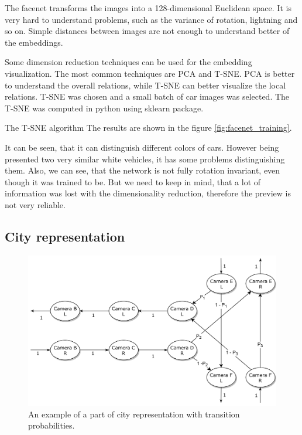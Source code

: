 \documentclass[a4paper,11pt,titlepage,twoside]{article}
\numberwithin{figure}{section}
\begin{document}
The facenet transforms the images into a 128-dimensional Euclidean space. It is very hard to understand problems, such as the variance of rotation, lightning and so on. Simple distances between images are not enough to understand better of the embeddings. 

Some dimension reduction techniques can be used for the embedding visualization. The most common techniques are PCA\cite{wold1987principal} and T-SNE\cite{maaten2008visualizing}. PCA is better to understand the overall relations, while T-SNE can better visualize the local relations. T-SNE was chosen and a small batch of car images was selected. The T-SNE was computed in python using sklearn\cite{pedregosa2011scikit} package.

The T-SNE algorithm The results are shown in the figure \ref{fig:facenet_training}.

It can be seen, that it can distinguish different colors of cars. However being presented two very similar white vehicles, it has some problems distinguishing them. Also, we can see, that the network is not fully rotation invariant, even though it was trained to be. But we need to keep in mind, that a lot of information was lost with the dimensionality reduction, therefore the preview is not very reliable.


\subsection{City representation}
\label{sec:city-representation}
\begin{figure}[h!]
\centering
\includegraphics[width=1\linewidth]{fig/intersection.png}
\caption{An example of a part of city representation with transition probabilities.}
\label{fig:intersection}
\end{figure}
\end{document}
